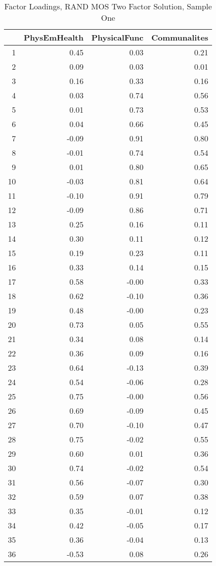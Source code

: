 \documentclass{article}
\begin{document}
\begin{table}[ht]
\centering
\begin{tabular}{rrrr}
  \hline
 & PhysEmHealth & PhysicalFunc & Communalites \\ 
  \hline
1 & 0.45 & 0.03 & 0.21 \\ 
  2 & 0.09 & 0.03 & 0.01 \\ 
  3 & 0.16 & 0.33 & 0.16 \\ 
  4 & 0.03 & 0.74 & 0.56 \\ 
  5 & 0.01 & 0.73 & 0.53 \\ 
  6 & 0.04 & 0.66 & 0.45 \\ 
  7 & -0.09 & 0.91 & 0.80 \\ 
  8 & -0.01 & 0.74 & 0.54 \\ 
  9 & 0.01 & 0.80 & 0.65 \\ 
  10 & -0.03 & 0.81 & 0.64 \\ 
  11 & -0.10 & 0.91 & 0.79 \\ 
  12 & -0.09 & 0.86 & 0.71 \\ 
  13 & 0.25 & 0.16 & 0.11 \\ 
  14 & 0.30 & 0.11 & 0.12 \\ 
  15 & 0.19 & 0.23 & 0.11 \\ 
  16 & 0.33 & 0.14 & 0.15 \\ 
  17 & 0.58 & -0.00 & 0.33 \\ 
  18 & 0.62 & -0.10 & 0.36 \\ 
  19 & 0.48 & -0.00 & 0.23 \\ 
  20 & 0.73 & 0.05 & 0.55 \\ 
  21 & 0.34 & 0.08 & 0.14 \\ 
  22 & 0.36 & 0.09 & 0.16 \\ 
  23 & 0.64 & -0.13 & 0.39 \\ 
  24 & 0.54 & -0.06 & 0.28 \\ 
  25 & 0.75 & -0.00 & 0.56 \\ 
  26 & 0.69 & -0.09 & 0.45 \\ 
  27 & 0.70 & -0.10 & 0.47 \\ 
  28 & 0.75 & -0.02 & 0.55 \\ 
  29 & 0.60 & 0.01 & 0.36 \\ 
  30 & 0.74 & -0.02 & 0.54 \\ 
  31 & 0.56 & -0.07 & 0.30 \\ 
  32 & 0.59 & 0.07 & 0.38 \\ 
  33 & 0.35 & -0.01 & 0.12 \\ 
  34 & 0.42 & -0.05 & 0.17 \\ 
  35 & 0.36 & -0.04 & 0.13 \\ 
  36 & -0.53 & 0.08 & 0.26 \\ 
   \hline
\end{tabular}
\caption{Factor Loadings, RAND MOS Two Factor Solution, Sample One} 
\label{tab:rand2fact}
\end{table}
\end{document}
